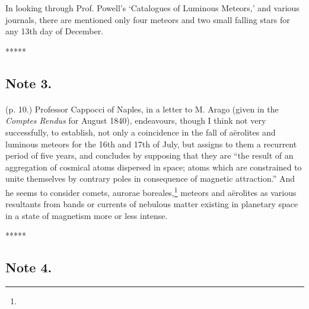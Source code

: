 \documentclass[a4paper, 12pt, oneside]{article}
\begin{document}
In looking through Prof. Powell's `Catalogues of Luminous Meteors,' and various journals, there are mentioned only four meteors and two small falling stars for any 13th day of December.

\centerline{*\hspace{15mm}*\hspace{15mm}*\hspace{15mm}*\hspace{15mm}*}
\bigskip

\subsection{Note 3.}
\paragraph{}
(p. 10.) Professor Cappocci of Naples, in a letter to M. Arago (given in the \emph{Comptes Rendus} for August 1840), endeavours, though I think not very successfully, to establish, not only a coincidence in the fall of aërolites and luminous meteors for the 16th and 17th of July, but assigns to them a recurrent period of five years, and concludes by supposing that they are ``the result of an aggregation of cosmical atoms dispersed in space; atoms which are constrained to unite themselves by contrary poles in consequence of magnetic attraction.'' And he seems to consider comets, aurorae boreales,\footnote{} meteors and aërolites as various resultants from bands or currents of nebulous matter existing in planetary space in a state of magnetism more or less intense.

\centerline{*\hspace{15mm}*\hspace{15mm}*\hspace{15mm}*\hspace{15mm}*}
\bigskip

\subsection{Note 4.}
\end{document}
